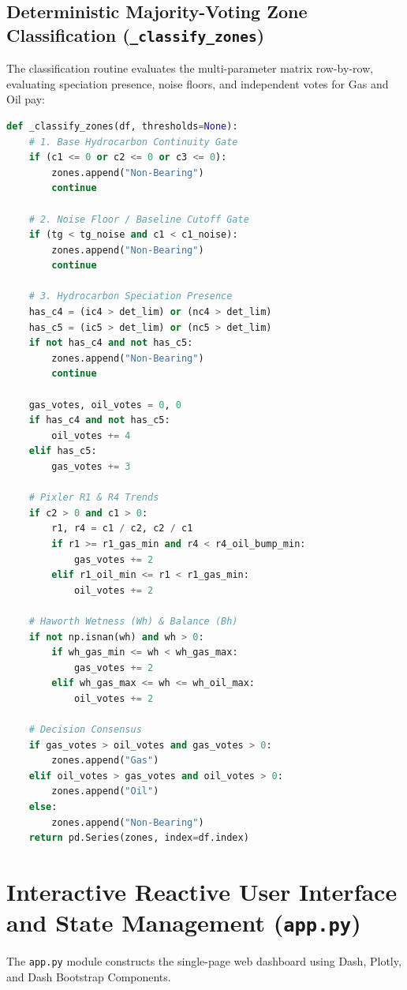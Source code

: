 \subsection{Deterministic Majority-Voting Zone Classification (\texttt{\_classify\_zones})}
The classification routine evaluates the multi-parameter matrix row-by-row, evaluating speciation presence, noise floors, and independent votes for Gas and Oil pay:
\begin{lstlisting}[language=Python, caption={Majority-voting zone classification in \texttt{engine.py}}]
def _classify_zones(df, thresholds=None):
    # 1. Base Hydrocarbon Continuity Gate
    if (c1 <= 0 or c2 <= 0 or c3 <= 0):
        zones.append("Non-Bearing")
        continue

    # 2. Noise Floor / Baseline Cutoff Gate
    if (tg < tg_noise and c1 < c1_noise):
        zones.append("Non-Bearing")
        continue

    # 3. Hydrocarbon Speciation Presence
    has_c4 = (ic4 > det_lim) or (nc4 > det_lim)
    has_c5 = (ic5 > det_lim) or (nc5 > det_lim)
    if not has_c4 and not has_c5:
        zones.append("Non-Bearing")
        continue

    gas_votes, oil_votes = 0, 0
    if has_c4 and not has_c5:
        oil_votes += 4
    elif has_c5:
        gas_votes += 3

    # Pixler R1 & R4 Trends
    if c2 > 0 and c1 > 0:
        r1, r4 = c1 / c2, c2 / c1
        if r1 >= r1_gas_min and r4 < r4_oil_bump_min:
            gas_votes += 2
        elif r1_oil_min <= r1 < r1_gas_min:
            oil_votes += 2

    # Haworth Wetness (Wh) & Balance (Bh)
    if not np.isnan(wh) and wh > 0:
        if wh_gas_min <= wh < wh_gas_max:
            gas_votes += 2
        elif wh_gas_max <= wh <= wh_oil_max:
            oil_votes += 2

    # Decision Consensus
    if gas_votes > oil_votes and gas_votes > 0:
        zones.append("Gas")
    elif oil_votes > gas_votes and oil_votes > 0:
        zones.append("Oil")
    else:
        zones.append("Non-Bearing")
    return pd.Series(zones, index=df.index)
\end{lstlisting}

\section{Interactive Reactive User Interface and State Management (\texttt{app.py})}

The \texttt{app.py} module constructs the single-page web dashboard using Dash, Plotly, and Dash Bootstrap Components.

